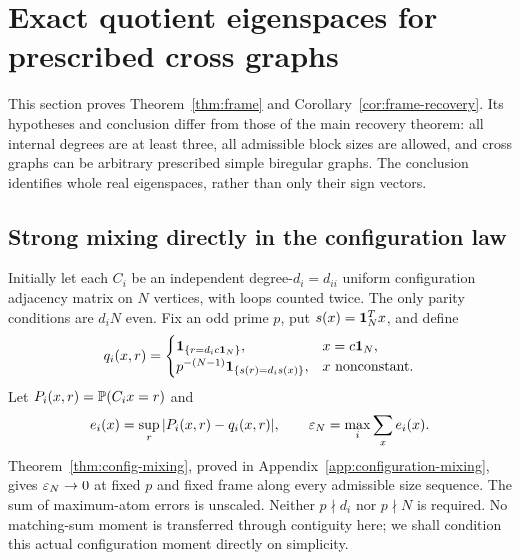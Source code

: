 \section{Exact quotient eigenspaces for prescribed cross graphs}\label{sec:frame}

This section proves Theorem~\ref{thm:frame} and
Corollary~\ref{cor:frame-recovery}. Its hypotheses and conclusion
differ from those of the main recovery theorem: all internal degrees
are at least three, all admissible block sizes are allowed, and cross graphs can be
arbitrary prescribed simple biregular graphs. The conclusion identifies
whole real eigenspaces, rather than only their sign vectors.

\subsection{Strong mixing directly in the configuration law}
Initially let each $C_i$ be an independent degree-$d_i=d_{ii}$ uniform
configuration adjacency matrix on $N$ vertices, with loops counted
twice. The only parity conditions are $d_iN$ even. Fix an odd prime
$p$, put $s(x)=\mathbf 1_N^Tx$, and define
\begin{equation}\label{eq:q-reference}
 q_i(x,r)=\begin{cases}
 \mathbf 1_{\{r=d_ic\mathbf 1_N\}},&x=c\mathbf 1_N,\\
 p^{-(N-1)}\mathbf 1_{\{s(r)=d_is(x)\}},&x\text{ nonconstant}.
 \end{cases}
\end{equation}
Let $P_i(x,r)=\mathbb P(C_ix=r)$ and
\begin{equation}\label{eq:mix-error}
 e_i(x)=\sup_r|P_i(x,r)-q_i(x,r)|,\qquad
 \varepsilon_N=\max_i\sum_xe_i(x).
\end{equation}
Theorem~\ref{thm:config-mixing}, proved in
Appendix~\ref{app:configuration-mixing}, gives $\varepsilon_N\to0$ at
fixed $p$ and fixed frame along every admissible size sequence.
The sum of maximum-atom errors is unscaled. Neither $p\nmid d_i$
nor $p\nmid N$ is required. No matching-sum moment is transferred
through contiguity here; we shall condition this actual configuration
moment directly on simplicity.

